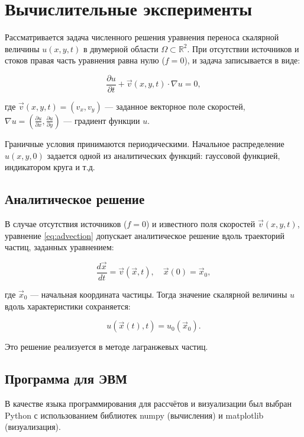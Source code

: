 \chapter{Вычислительные эксперименты}
Рассматривается задача численного решения уравнения переноса скалярной величины \( u(x, y, t) \) в двумерной области \(\Omega \subset \mathbb{R}^2\). При отсутствии источников и стоков правая часть уравнения равна нулю (\(f = 0\)), и задача записывается в виде:

\begin{equation}
	\frac{\partial u}{\partial t} + \vec{v}(x, y, t) \cdot \nabla u = 0,
	\label{eq:advection}
\end{equation}

где \( \vec{v}(x, y, t) = (v_x, v_y) \) — заданное векторное поле скоростей, \( \nabla u = \left( \frac{\partial u}{\partial x}, \frac{\partial u}{\partial y} \right) \) — градиент функции \( u \).

Граничные условия принимаются периодическими. Начальное распределение \( u(x, y, 0) \) задается одной из аналитических функций: гауссовой функцией, индикатором круга и т.д.

\section{Аналитическое решение}

В случае отсутствия источников (\(f = 0\)) и известного поля скоростей \(\vec{v}(x,y,t)\), уравнение \eqref{eq:advection} допускает аналитическое решение вдоль траекторий частиц, заданных уравнением:

\begin{equation}
	\frac{d\vec{x}}{dt} = \vec{v}(\vec{x}, t), \quad \vec{x}(0) = \vec{x}_0,
	\label{eq:characteristics}
\end{equation}

где \(\vec{x}_0\) — начальная координата частицы. Тогда значение скалярной величины \(u\) вдоль характеристики сохраняется:

\begin{equation}
	u(\vec{x}(t), t) = u_0(\vec{x}_0).
	\label{eq:solution_along_characteristics}
\end{equation}

Это решение реализуется в методе лагранжевых частиц.
\section{Программа для ЭВМ}
В качестве языка программирования для рассчётов и
визуализации был выбран Python с использованием библиотек numpy
(вычисления) и matplotlib (визуализация).
